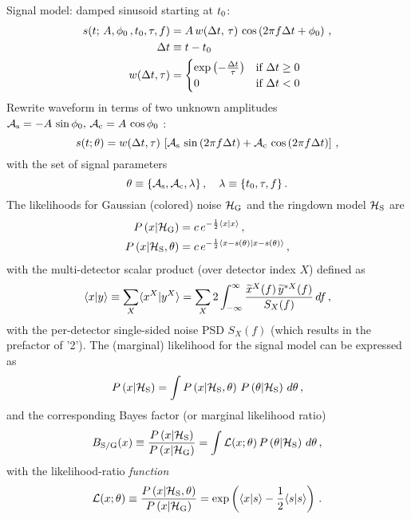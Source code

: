 \documentclass[aps,prd,onecolumn,nofootinbib,superscriptaddress,altaffilletter,floatfix]{revtex4-1}
\begin{document}
Signal model: damped sinusoid starting at $t_0$:
\begin{align}
  \label{eq:1}
  s(t;\,A, \phi_0\,, t_0, \tau, f) &= A\,w(\Delta t,\,\tau)\,\cos\left(2\pi f \Delta t + \phi_0\right)\,,\\
  \Delta t & \equiv t - t_0\,\\
  w(\Delta t, \tau) &=
  \begin{cases}
    \exp\left( -\frac{\Delta t}{\tau} \right) & \text{if } \Delta t \ge 0\,\\
    0  & \text{if } \Delta t < 0
  \end{cases}
\end{align}
Rewrite waveform in terms of two unknown amplitudes $\mathcal{A}_{\mathrm{s}} = -A\,\sin\phi_0,\,\mathcal{A}_{\mathrm{c}} = A\,\cos\phi_0$ \cite{bretthorst1988:_bayesian_spectrum}:
\begin{equation}
  \label{eq:2}
  s(t; \theta) = w(\Delta t,\tau)\, \left[ \mathcal{A}_{\mathrm{s}}\,\sin\left(2\pi f \Delta t\right) + \mathcal{A}_{\mathrm{c}}\,\cos\left(2\pi f \Delta t\right) \right]\,,
\end{equation}
with the set of signal parameters
\begin{equation}
  \label{eq:11}
  \theta \equiv \{\mathcal{A}_{\mathrm{s}},\mathcal{A}_{\mathrm{c}}, \lambda\}\,,\quad \lambda \equiv \{t_0,\tau, f\}\,.
\end{equation}
The likelihoods for Gaussian (colored) noise $\mathcal{H}_{\mathrm{G}}$ and the ringdown model $\mathcal{H}_{\mathrm{S}}$ are
\begin{align}
  \label{eq:4}
  P\left(x|\mathcal{H}_{\mathrm{G}}\right) &= c\,e^{-\frac{1}{2}\langle x|x\rangle}\,,\\
  P\left(x|\mathcal{H}_{\mathrm{S}},\theta\right) &= c\,e^{-\frac{1}{2}\langle x-s(\theta)|x-s(\theta)\rangle}\,,
\end{align}
with the multi-detector scalar product (over detector index $X$) defined as
\begin{equation}
  \label{eq:5}
  \langle x|y\rangle\equiv \sum_{X} \langle x^X|y^X\rangle = \sum_X 2\int_{-\infty}^{\infty} \frac{\widetilde{x}^X(f)\,\widetilde{y}^{*X}(f)}{S_X(f)}\,df\,,
\end{equation}
with the per-detector single-sided noise PSD $S_X(f)$ (which results in the prefactor of '2').
The (marginal) likelihood for the signal model can be expressed as
\begin{equation}
  \label{eq:6}
  P\left(x|\mathcal{H}_{\mathrm{S}}\right) = \int P\left(x|\mathcal{H}_{\mathrm{S}},\theta\right)\,P\left(\theta|\mathcal{H}_{\mathrm{S}}\right)\,d\theta\,,
\end{equation}
and the corresponding Bayes factor (or marginal likelihood ratio)
\begin{equation}
  \label{eq:7}
  B_{\mathrm{S/G}}(x) \equiv \frac{P\left(x|\mathcal{H}_{\mathrm{S}}\right)}{P\left(x|\mathcal{H}_{\mathrm{G}}\right)} = \int \mathcal{L}(x;\theta)\,P\left(\theta|\mathcal{H}_{\mathrm{S}}\right)\,d\theta\,,
\end{equation}
with the likelihood-ratio \emph{function}
\begin{equation}
  \label{eq:8}
  \mathcal{L}(x;\theta) \equiv \frac{P\left(x|\mathcal{H}_{\mathrm{S}},\theta\right)}{P\left(x|\mathcal{H}_{\mathrm{G}}\right)} = \exp\left(\langle x|s\rangle - \frac{1}{2}\langle s|s\rangle\right)\,.
\end{equation}
\end{document}
